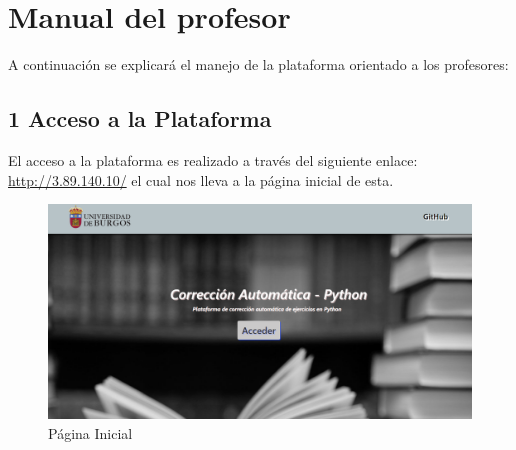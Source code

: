 \section{Manual del profesor}
A continuación se explicará el manejo de la plataforma orientado a los profesores:

\subsection{1 Acceso a la Plataforma}
El acceso a la plataforma es realizado a través del siguiente enlace: \url{http://3.89.140.10/} el cual nos lleva a la página inicial de esta.

\begin{figure}[H]
    \centering
    \includegraphics[width=\textwidth]{img/imgs-memoria/Landing.PNG}
    \caption{Página Inicial}
\end{figure}

